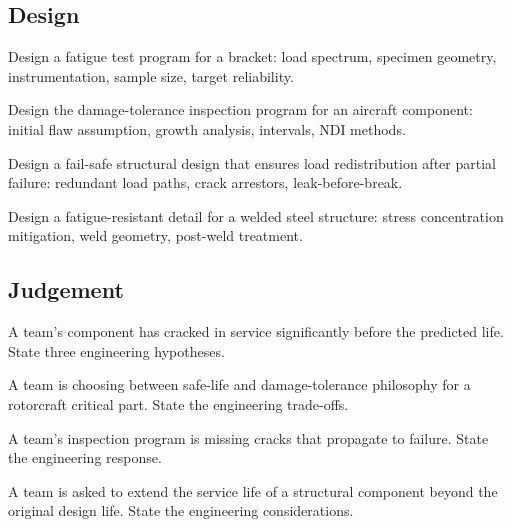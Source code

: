 \subsection*{Design}

\begin{exercise}
Design a fatigue test program for a bracket: load spectrum, specimen geometry, instrumentation, sample size, target reliability.
\end{exercise}

\begin{exercise}
Design the damage-tolerance inspection program for an aircraft component: initial flaw assumption, growth analysis, intervals, NDI methods.
\end{exercise}

\begin{exercise}
Design a fail-safe structural design that ensures load redistribution after partial failure: redundant load paths, crack arrestors, leak-before-break.
\end{exercise}

\begin{exercise}
Design a fatigue-resistant detail for a welded steel structure: stress concentration mitigation, weld geometry, post-weld treatment.
\end{exercise}

\subsection*{Judgement}

\begin{exercise}
A team's component has cracked in service significantly before the predicted life. State three engineering hypotheses.
\end{exercise}

\begin{exercise}
A team is choosing between safe-life and damage-tolerance philosophy for a rotorcraft critical part. State the engineering trade-offs.
\end{exercise}

\begin{exercise}
A team's inspection program is missing cracks that propagate to failure. State the engineering response.
\end{exercise}

\begin{exercise}
A team is asked to extend the service life of a structural component beyond the original design life. State the engineering considerations.
\end{exercise}

